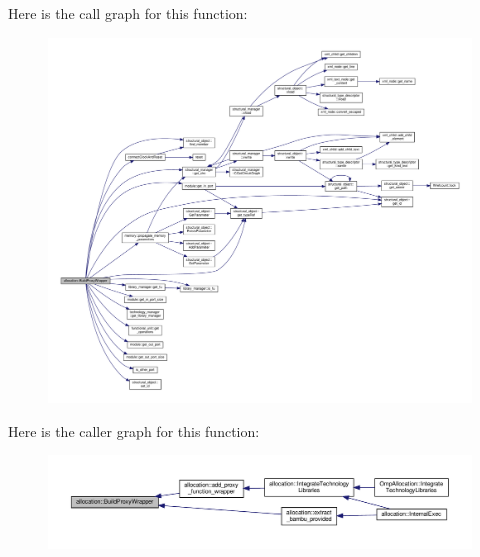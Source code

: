 Here is the call graph for this function\+:
\nopagebreak
\begin{figure}[H]
\begin{center}
\leavevmode
\includegraphics[width=350pt]{d0/d74/classallocation_a6a0e21dd875ccd2320ec1c3032bd53c1_cgraph}
\end{center}
\end{figure}
Here is the caller graph for this function\+:
\nopagebreak
\begin{figure}[H]
\begin{center}
\leavevmode
\includegraphics[width=350pt]{d0/d74/classallocation_a6a0e21dd875ccd2320ec1c3032bd53c1_icgraph}
\end{center}
\end{figure}
\mbox{\label{classallocation_abcfa5870832b4b9d8d194054d7b2f86b}} 
